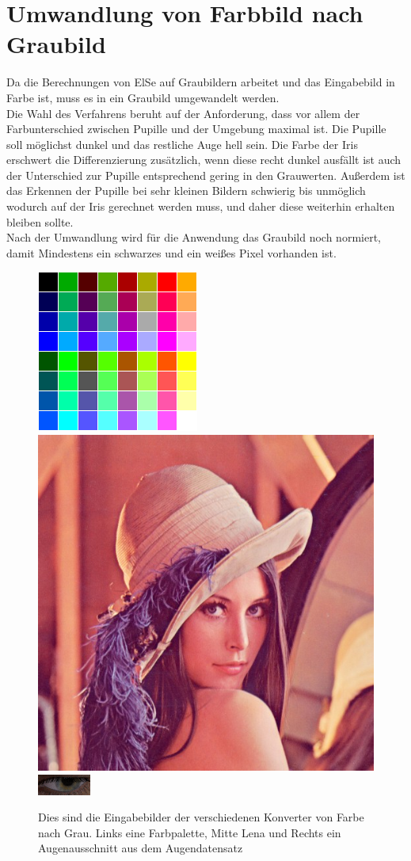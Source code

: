 \section{Umwandlung von Farbbild nach Graubild}
\label{Graubild}
Da die Berechnungen von ElSe auf Graubildern arbeitet und das Eingabebild in Farbe ist, muss es in ein Graubild umgewandelt werden.\\
Die Wahl des Verfahrens beruht auf der Anforderung, dass vor allem der Farbunterschied zwischen Pupille und der Umgebung maximal ist. Die Pupille soll möglichst dunkel und das restliche Auge hell sein. Die Farbe der Iris erschwert die Differenzierung zusätzlich, wenn diese recht dunkel ausfällt ist auch der Unterschied zur Pupille entsprechend gering in den Grauwerten. Außerdem ist das Erkennen der Pupille bei sehr kleinen Bildern schwierig bis unmöglich wodurch auf der Iris gerechnet werden muss, und daher diese weiterhin erhalten bleiben sollte.\\
Nach der Umwandlung wird für die Anwendung das Graubild noch normiert, damit Mindestens ein schwarzes und ein weißes Pixel vorhanden ist.
\begin{figure}
	\centering
	\includegraphics[width=0.2\linewidth]{img/Farbtafel2}
	\includegraphics[width=0.2\linewidth]{img/lena}
	\includegraphics[width=0.2\linewidth]{img/Auge}
	\caption{Dies sind die Eingabebilder der verschiedenen Konverter von Farbe nach Grau. Links eine Farbpalette, Mitte Lena und Rechts ein Augenausschnitt aus dem Augendatensatz \cite{database_Eye}}
	\label{img_Gray_Einagbe}
\end{figure}
